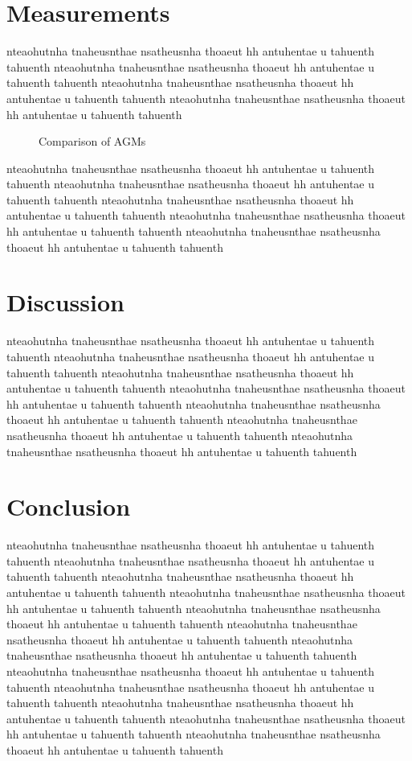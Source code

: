 \section{Measurements}
nteaohutnha tnaheusnthae nsatheusnha thoaeut hh antuhentae u tahuenth tahuenth
nteaohutnha tnaheusnthae nsatheusnha thoaeut hh antuhentae u tahuenth tahuenth
nteaohutnha tnaheusnthae nsatheusnha thoaeut hh antuhentae u tahuenth tahuenth
nteaohutnha tnaheusnthae nsatheusnha thoaeut hh antuhentae u tahuenth tahuenth
\begin{figure}[!htb]
    \begin{center}
        \scalebox{0.54}{}
        \caption{Comparison of AGMs}
        \label{fig:comparison_chart}
    \end{center}
\end{figure}
nteaohutnha tnaheusnthae nsatheusnha thoaeut hh antuhentae u tahuenth tahuenth
nteaohutnha tnaheusnthae nsatheusnha thoaeut hh antuhentae u tahuenth tahuenth
nteaohutnha tnaheusnthae nsatheusnha thoaeut hh antuhentae u tahuenth tahuenth
nteaohutnha tnaheusnthae nsatheusnha thoaeut hh antuhentae u tahuenth tahuenth
nteaohutnha tnaheusnthae nsatheusnha thoaeut hh antuhentae u tahuenth tahuenth

\section{Discussion}
nteaohutnha tnaheusnthae nsatheusnha thoaeut hh antuhentae u tahuenth tahuenth
nteaohutnha tnaheusnthae nsatheusnha thoaeut hh antuhentae u tahuenth tahuenth
nteaohutnha tnaheusnthae nsatheusnha thoaeut hh antuhentae u tahuenth tahuenth
nteaohutnha tnaheusnthae nsatheusnha thoaeut hh antuhentae u tahuenth tahuenth
nteaohutnha tnaheusnthae nsatheusnha thoaeut hh antuhentae u tahuenth tahuenth
nteaohutnha tnaheusnthae nsatheusnha thoaeut hh antuhentae u tahuenth tahuenth
nteaohutnha tnaheusnthae nsatheusnha thoaeut hh antuhentae u tahuenth tahuenth

\section{Conclusion}
nteaohutnha tnaheusnthae nsatheusnha thoaeut hh antuhentae u tahuenth tahuenth
nteaohutnha tnaheusnthae nsatheusnha thoaeut hh antuhentae u tahuenth tahuenth
nteaohutnha tnaheusnthae nsatheusnha thoaeut hh antuhentae u tahuenth tahuenth
nteaohutnha tnaheusnthae nsatheusnha thoaeut hh antuhentae u tahuenth tahuenth
nteaohutnha tnaheusnthae nsatheusnha thoaeut hh antuhentae u tahuenth tahuenth
nteaohutnha tnaheusnthae nsatheusnha thoaeut hh antuhentae u tahuenth tahuenth
nteaohutnha tnaheusnthae nsatheusnha thoaeut hh antuhentae u tahuenth tahuenth
nteaohutnha tnaheusnthae nsatheusnha thoaeut hh antuhentae u tahuenth tahuenth
nteaohutnha tnaheusnthae nsatheusnha thoaeut hh antuhentae u tahuenth tahuenth
nteaohutnha tnaheusnthae nsatheusnha thoaeut hh antuhentae u tahuenth tahuenth
nteaohutnha tnaheusnthae nsatheusnha thoaeut hh antuhentae u tahuenth tahuenth
nteaohutnha tnaheusnthae nsatheusnha thoaeut hh antuhentae u tahuenth tahuenth

% 
% 





